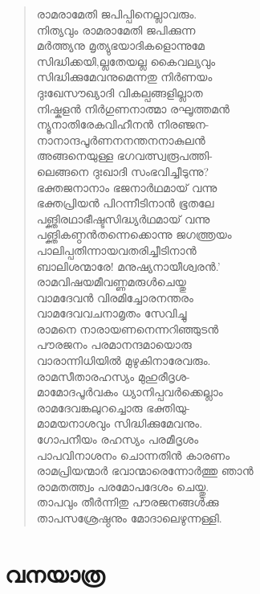 \begin{verse}
രാമരാമേതി ജപിപ്പിനെല്ലാവരും.\\
നിത്യവും രാമരാമേതി ജപിക്കുന്ന\\
മര്‍ത്ത്യനു മൃത്യുഭയാദികളൊന്നുമേ\\
സിദ്ധിക്കയി,ല്ലതേയല്ല കൈവല്യവും\\
സിദ്ധിക്കുമേവനുമെന്നതു നിര്‍ണയം\\
ദുഃഖേസൗഖ്യാദി വികല്പങ്ങളില്ലാത\\
നിഷ്കളന്‍ നിര്‍ഗുണനാത്മാ രഘൂത്തമന്‍\\
ന്യൂനാതിരേകവിഹീനന്‍ നിരഞ്ജന-\\
നാനാന്ദപൂര്‍ണനനന്തനനാകുലന്‍\\
അങ്ങനെയുള്ള ഭഗവത്സ്വരൂപത്തി-\\
ലെങ്ങനെ ദുഃഖാദി സംഭവിച്ചീടുന്നു?\\
ഭക്തജനാനാം ഭജനാര്‍ഥമായ് വന്നു\\
ഭക്തപ്രിയന്‍ പിറന്നീടിനാന്‍ ഭൂതലേ\\
പങ്ക്തിരഥാഭീഷ്ടസിദ്ധ്യര്‍ഥമായ് വന്നു\\
പങ്ക്തികണ്ഠന്‍തന്നെക്കൊന്നു ജഗത്ത്രയം\\
പാലിപ്പതിന്നായവതരിച്ചീടിനാന്‍\\
ബാലിശന്മാരേ! മനുഷ്യനായീശ്വരന്‍.’\\
രാമവിഷയമീവണ്ണമരുള്‍ചെയ്തു\\
വാമദേവന്‍ വിരമിച്ചോരനന്തരം\\
വാമദേവവചനാമൃതം സേവിച്ചു\\
രാമനെ നാരായണനെന്നറിഞ്ഞുടന്‍\\
പൗരജനം പരമാനന്ദമായൊരു\\
വാരാന്നിധിയില്‍ മുഴുകിനാരേവരും.\\
രാമസീതാരഹസ്യം മുഹുരീദൃശ-\\
മാമോദപൂര്‍വകം ധ്യാനിപ്പവര്‍ക്കെല്ലാം\\
രാമദേവങ്കലുറച്ചൊരു ഭക്തിയു-\\
മാമയനാശവും സിദ്ധിക്കുമേവനും.\\
ഗോപനീയം രഹസ്യം പരമീദൃശം\\
പാപവിനാശനം ചൊന്നതിന്‍ കാരണം\\
രാമപ്രിയന്മാര്‍ ഭവാന്മാരെന്നോര്‍ത്തു ഞാന്‍\\
രാമതത്ത്വം പരമോപദേശം ചെയ്തു.\\
താപവും തീര്‍ന്നിതു പൗരജനങ്ങള്‍ക്കു\\
താപസശ്രേഷ്ഠനും മോദാലെഴുന്നള്ളി.
\end{verse}


\section{വനയാത്ര}

